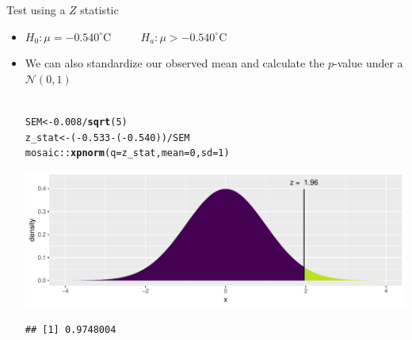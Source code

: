 \documentclass{beamer}\usepackage[]{graphicx}\usepackage[]{color}
\newcommand{\hlnum}[1]{\textcolor[rgb]{0.686,0.059,0.569}{#1}}%
\newcommand{\hlopt}[1]{\textcolor[rgb]{0,0,0}{#1}}%
\newcommand{\hlstd}[1]{\textcolor[rgb]{0.345,0.345,0.345}{#1}}%
\newcommand{\hlkwb}[1]{\textcolor[rgb]{0.69,0.353,0.396}{#1}}%
\newcommand{\hlkwc}[1]{\textcolor[rgb]{0.333,0.667,0.333}{#1}}%
\newcommand{\hlkwd}[1]{\textcolor[rgb]{0.737,0.353,0.396}{\textbf{#1}}}%
\newenvironment{knitrout}{}{} %
\begin{document}
\begin{frame}[fragile]{Test using a $Z$ statistic}
\begin{itemize}
	\setlength\itemsep{.7em}
	\item   $H_0: \mu =  -0.540^{\circ}$C $\qquad$  $H_a: \mu >  -0.540^{\circ}$C
	
	\item We can also standardize our observed mean and calculate the $p$-value under a $\mathcal{N}(0,1)$ \\ \ \\

\begin{knitrout}\scriptsize
{}\color{fgcolor}
\begin{alltt}
\hlstd{SEM} \hlkwb{<-} \hlnum{0.008}\hlopt{/}\hlkwd{sqrt}\hlstd{(}\hlnum{5}\hlstd{)}
\hlstd{z_stat} \hlkwb{<-} \hlstd{(}\hlopt{-}\hlnum{0.533} \hlopt{-} \hlstd{(}\hlopt{-}\hlnum{0.540}\hlstd{))} \hlopt{/} \hlstd{SEM}
\hlstd{mosaic}\hlopt{::}\hlkwd{xpnorm}\hlstd{(}\hlkwc{q} \hlstd{= z_stat,} \hlkwc{mean} \hlstd{=} \hlnum{0}\hlstd{,} \hlkwc{sd} \hlstd{=} \hlnum{1}\hlstd{)}
\end{alltt}


{\ttfamily\noindent\itshape\color{messagecolor}{\#\# }}

{\ttfamily\noindent\itshape{}}

{\ttfamily\noindent\itshape\color{messagecolor}{\#\# 	P(X <= 1.957) = P(Z <= 1.957) = 0.9748}}

{\ttfamily\noindent\itshape\color{messagecolor}{\#\# 	P(X >\ \ 1.957) = P(Z >\ \ 1.957) = 0.0252}}

{\ttfamily\noindent\itshape\color{messagecolor}{\#\# }}

{\centering \includegraphics[width=1\linewidth]{figure/unnamed-chunk-2-1} 

}


\begin{verbatim}
## [1] 0.9748004
\end{verbatim}

\end{knitrout}
	
\end{itemize}
\end{frame}
\end{document}
